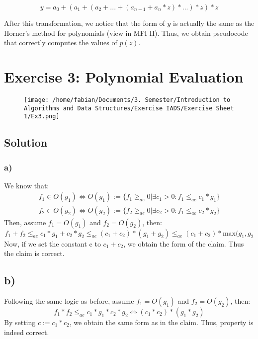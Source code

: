 \documentclass[a4paper,11pt]{article}
\begin{document}
	\[
	y = a_0 + (a_1 +(a_2 + ... + (a_{n-1} + a_n*z)*...)*z)*z
	\] 
	
	After this transformation, we notice that the form of \(y\) is actually the same as the Horner's method for polynomials (view in MFI II). Thus, we obtain pseudocode that correctly computes the values of \(p(z)\).
	
	\newpage
		
	\section*{Exercise 3: Polynomial Evaluation}
	
	\begin{figure}[htpb]
		\centering
		\texttt{[image: /home/fabian/Documents/3. Semester/Introduction to Algorithms and Data Structures/Exercise IADS/Exercise Sheet 1/Ex3.png]}
	\end{figure}
	
	\subsection*{Solution}
	
	\subsubsection*{a)}
	
	We know that:
	\begin{align*}
		f_1 \in O(g_1) \Leftrightarrow O(g_1) := \{f_1 \ge_{ae} 0 | \exists c_1 > 0 : f_1 \le_{ae} c_1*g_1  \} \\
		f_2 \in O(g_2) \Leftrightarrow O(g_2) := \{f_2 \ge_{ae} 0 | \exists c_2 > 0 : f_1 \le_{ae} c_2*g_2  \} 
	\end{align*}
	Then, assume \(f_1 =  O(g_1)\) and \(f_2 = O(g_2)\), then:
	\[
		f_1 + f_2 \le_{ae} c_1*g_1 + c_2*g_2 \le_{ae} (c_1 + c_2)*(g_1 + g_2) \le_{ae} (c_1 + c_2)*\text{max}(g_1,g_2 
	\]
	Now, if we set the constant c to \(c_1 + c_2\), we obtain the form of the claim. Thus the claim is correct.
	
	\subsection*{b)}
	
	Following the same logic as before, assume \(f_1 =  O(g_1)\) and \(f_2 = O(g_2)\), then:
	\[
	f_1*f_2 \le_{ae} c_1*g_1 * c_2*g_2 \Leftrightarrow (c_1*c_2)*(g_1*g_2)
	\]
	By setting \(c := c_1 * c_2\), we obtain the same form as in the claim. Thus, property is indeed correct.
	\newpage
	
\end{document}
